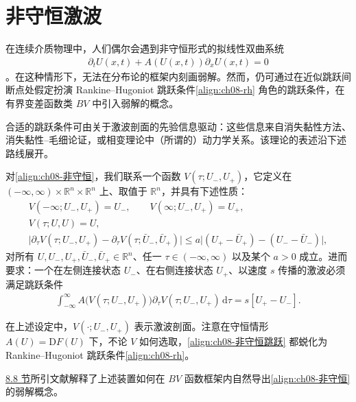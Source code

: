 \documentclass[../../main.tex]{subfiles}
\begin{document}
\section{非守恒激波}\label{section:ch08-非守恒激波}

在连续介质物理中，人们偶尔会遇到非守恒形式的拟线性双曲系统
\begin{align}
\partial_t U(x,t)+A(U(x,t))\partial_x U(x,t)=0
\label{align:ch08-非守恒}
\end{align}
。在这种情形下，无法在分布论的框架内刻画弱解。然而，仍可通过在近似跳跃间断点处假定扮演 Rankine--Hugoniot 跳跃条件\eqref{align:ch08-rh} 角色的跳跃条件，在有界变差函数类 $BV$ 中引入弱解的概念。

合适的跳跃条件可由关于激波剖面的先验信息驱动：这些信息来自消失黏性方法、消失黏性--毛细论证，或相变理论中（所谓的）动力学关系。该理论的表述沿下述路线展开。

对\eqref{align:ch08-非守恒}，我们联系一个函数 $V(\tau;U_-,U_+)$，它定义在 $(-\infty,\infty)\times\mathbb R^n\times\mathbb R^n$ 上、取值于 $\mathbb R^n$，并具有下述性质：
\begin{align}
V(-\infty;U_-,U_+)=U_-,\qquad V(\infty;U_-,U_+)=U_+,
\label{align:ch08-边界剖面}\\
V(\tau;U,U)=U,
\label{align:ch08-对角剖面}\\
\big|\partial_\tau V(\tau;U_-,U_+)-\partial_\tau V(\tau;\bar U_-,\bar U_+)\big|
\leqslant a\big|(U_+-\bar U_+)-(U_--\bar U_-)\big|,
\label{align:ch08-Lipschitz剖面}
\end{align}
对所有 $U,U_-,U_+,\bar U_-,\bar U_+\in\mathbb R^n$、任一 $\tau\in(-\infty,\infty)$ 以及某个 $a>0$ 成立。进而要求：一个在左侧连接状态 $U_-$、在右侧连接状态 $U_+$、以速度 $s$ 传播的激波必须满足跳跃条件
\begin{align}
\int_{-\infty}^{\infty}A\big(V(\tau;U_-,U_+)\big)\partial_\tau V(\tau;U_-,U_+)\,\mathrm{d}\tau=s[U_+-U_-].
\label{align:ch08-非守恒跳跃}
\end{align}

在上述设定中，$V(\cdot;U_-,U_+)$ 表示激波剖面。注意在守恒情形 $A(U)=\mathrm{D}F(U)$ 下，不论 $V$ 如何选取，\eqref{align:ch08-非守恒跳跃} 都蜕化为 Rankine--Hugoniot 跳跃条件\eqref{align:ch08-rh}。

\hyperref[section:ch08-注记]{8.8 节}所引文献解释了上述装置如何在 $BV$ 函数框架内自然导出\eqref{align:ch08-非守恒} 的弱解概念。
\end{document}

